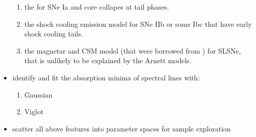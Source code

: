 \documentclass[letterpaper,10pt,english]{sphinxmanual}
\begin{document}
\begin{itemize}
\begin{enumerate}
\item {} 
the  for SNe Ia and core collapes at tail phases.

\item {} 
the shock cooling emission model  for SNe IIb or some Ibc that have early shock cooling tails.

\item {} 
the magnetar and CSM model (that were borrowed from ) for SLSNe, that is unlikely to be explained by the Arnett models.

\end{enumerate}

\item {} 
identify and fit the absorption minima of spectral lines with:
\begin{enumerate}
%
\item {} 
Gaussian

\item {} 
Viglot

\end{enumerate}

\item {} 
scatter all above features into parameter spaces for sample exploration

\end{itemize}
\end{document}
